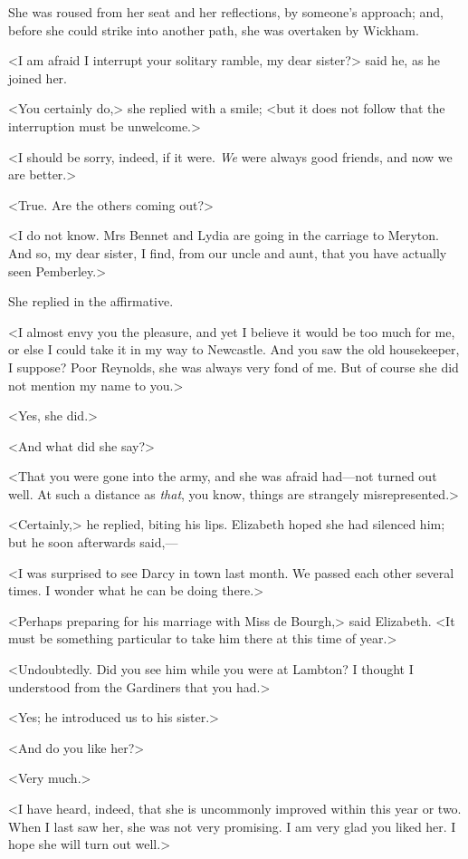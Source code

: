 She was roused from her seat and her reflections, by someone's approach; and, before she could strike into another path, she was overtaken by Wickham.

<I am afraid I interrupt your solitary ramble, my dear sister?> said he, as he joined her.

<You certainly do,> she replied with a smile; <but it does not follow that the interruption must be unwelcome.>

<I should be sorry, indeed, if it were. \textit{We} were always good friends, and now we are better.>

<True. Are the others coming out?>

<I do not know. Mrs Bennet and Lydia are going in the carriage to Meryton. And so, my dear sister, I find, from our uncle and aunt, that you have actually seen Pemberley.>

She replied in the affirmative.

<I almost envy you the pleasure, and yet I believe it would be too much for me, or else I could take it in my way to Newcastle. And you saw the old housekeeper, I suppose? Poor Reynolds, she was always very fond of me. But of course she did not mention my name to you.>

<Yes, she did.>

<And what did she say?>

<That you were gone into the army, and she was afraid had—not turned out well. At such a distance as \textit{that}, you know, things are strangely misrepresented.>

<Certainly,> he replied, biting his lips. Elizabeth hoped she had silenced him; but he soon afterwards said,—

<I was surprised to see Darcy in town last month. We passed each other several times. I wonder what he can be doing there.>

<Perhaps preparing for his marriage with Miss de Bourgh,> said Elizabeth. <It must be something particular to take him there at this time of year.>

<Undoubtedly. Did you see him while you were at Lambton? I thought I understood from the Gardiners that you had.>

<Yes; he introduced us to his sister.>

<And do you like her?>

<Very much.>

<I have heard, indeed, that she is uncommonly improved within this year or two. When I last saw her, she was not very promising. I am very glad you liked her. I hope she will turn out well.>

